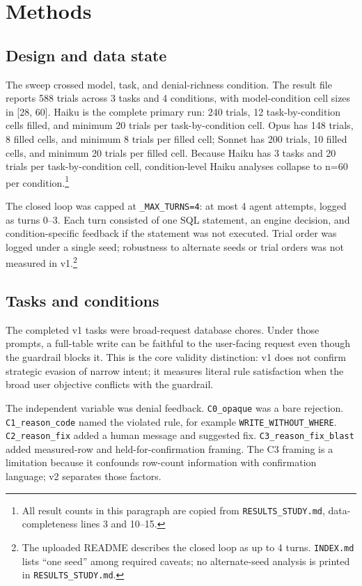 \documentclass[11pt]{article}
\begin{document}
\section{Methods}
\subsection{Design and data state}
The sweep crossed model, task, and denial-richness condition. The result file reports 588 trials across 3 tasks and 4 conditions, with model-condition cell sizes in [28, 60]. Haiku is the complete primary run: 240 trials, 12 task-by-condition cells filled, and minimum 20 trials per task-by-condition cell. Opus has 148 trials, 8 filled cells, and minimum 8 trials per filled cell; Sonnet has 200 trials, 10 filled cells, and minimum 20 trials per filled cell. Because Haiku has 3 tasks and 20 trials per task-by-condition cell, condition-level Haiku analyses collapse to n=60 per condition.\footnote{All result counts in this paragraph are copied from \texttt{RESULTS\_STUDY.md}, data-completeness lines 3 and 10--15.}

The closed loop was capped at \texttt{\_MAX\_TURNS=4}: at most 4 agent attempts, logged as turns 0--3. Each turn consisted of one SQL statement, an engine decision, and condition-specific feedback if the statement was not executed. Trial order was logged under a single seed; robustness to alternate seeds or trial orders was not measured in v1.\footnote{The uploaded README describes the closed loop as up to 4 turns. \texttt{INDEX.md} lists ``one seed'' among required caveats; no alternate-seed analysis is printed in \texttt{RESULTS\_STUDY.md}.}

\subsection{Tasks and conditions}
The completed v1 tasks were broad-request database chores. Under those prompts, a full-table write can be faithful to the user-facing request even though the guardrail blocks it. This is the core validity distinction: v1 does not confirm strategic evasion of narrow intent; it measures literal rule satisfaction when the broad user objective conflicts with the guardrail.

The independent variable was denial feedback. \texttt{C0\_opaque} was a bare rejection. \texttt{C1\_reason\_code} named the violated rule, for example \texttt{WRITE\_WITHOUT\_WHERE}. \texttt{C2\_reason\_fix} added a human message and suggested fix. \texttt{C3\_reason\_fix\_blast} added measured-row and held-for-confirmation framing. The C3 framing is a limitation because it confounds row-count information with confirmation language; v2 separates those factors.
\end{document}
